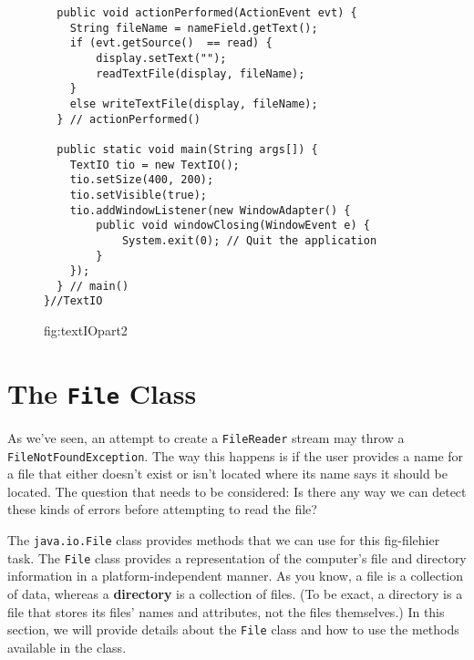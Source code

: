 \begin{figure}[tb]
\addtocounter{figure}{-1}
\jjjprogstart
\begin{jjjlisting}
\begin{lstlisting}
  public void actionPerformed(ActionEvent evt) {
    String fileName = nameField.getText();
    if (evt.getSource()  == read) {
        display.setText("");
        readTextFile(display, fileName);
    }
    else writeTextFile(display, fileName);
  } // actionPerformed()

  public static void main(String args[]) {
    TextIO tio = new TextIO();
    tio.setSize(400, 200);
    tio.setVisible(true);
    tio.addWindowListener(new WindowAdapter() {      
        public void windowClosing(WindowEvent e) {
            System.exit(0); // Quit the application
        }
    });
  } // main()
}//TextIO
\end{lstlisting}
\end{jjjlisting}
{fig:textIOpart2}

\end{figure}

\pagebreak
\section{The {\tt File} Class}
\noindent As we've seen, an attempt to create a {\tt FileReader}
stream may throw a {\tt FileNotFoundException}. The way this happens
is if the user provides a name for a file that either doesn't exist or 
isn't located where its name says it should be located.  The question that
needs to be considered: Is there any
way we can detect these kinds of errors before attempting to read the
file?

The {\tt java.io.File} class provides methods that we can use for this
{fig-filehier}
task.  The {\tt File} class provides a representation of the computer's
file and directory information in a platform-independent manner.  As you
know, a file is a collection of data, whereas a {\bf directory}
is a collection of files.  (To be exact, a directory is a file that stores
its files' names and attributes, not the files themselves.) In this section,
we will provide details about the {\tt File} class and how to
use the methods available in the class.

